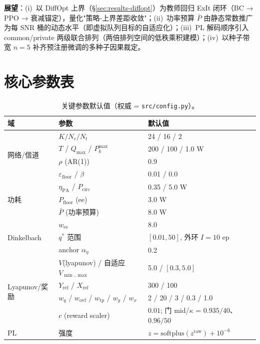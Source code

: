 \documentclass[UTF8,11pt,a4paper]{ctexart}
\theoremstyle{plain}
\theoremstyle{definition}
\theoremstyle{remark}
\begin{document}
\textbf{展望}：(i)~以 DiffOpt 上界（\S\ref{sec:results-diffopt}）为教师回归 ExIt 闭环（BC → PPO → 衰减锚定），量化"策略-上界差距收敛"；(ii)~功率预算 $\bar P$ 由静态常数推广为每 SNR 桶的动态水平（即虚拟队列目标的自适应化）；(iii)~PL 解码顺序引入 common/private 两级联合排列（两倍排列空间的低秩乘积建模）；(iv)~以种子带宽 $n=5$ 补齐预注册微调的多种子因果裁定。

\appendix
\section{核心参数表} \label{sec:params}

\begin{table}[ht]
\centering
\caption{关键参数默认值（权威 = \texttt{src/config.py}）。}
\label{tab:params}
\begin{tabular}{@{}lll@{}}
\toprule
域 & 参数 & 默认值\\
\midrule
\multirow{4}{*}{网络/信道} & $K/N_r/N_t$ & 24 / 16 / 2\\
 & $T$ / $Q_{\max}$ / $P_{k}^{\max}$ & 200 / 100 / 1.0 W\\
 & $\rho$ (AR(1)) & 0.9\\
 & $\varepsilon_{\mathrm{floor}}$ / $\beta$ & 0.01 / 0.0\\
\midrule
\multirow{3}{*}{功耗} & $\eta_{\mathrm{PA}}$ / $P_{\mathrm{circ}}$ & 0.35 / 5.0 W\\
 & $P_{\mathrm{floor}}$ (ee) & 3.0 W\\
 & $\bar P$ (功率预算) & 8.0 W\\
\midrule
\multirow{3}{*}{Dinkelbach} & $w_{\mathrm{ee}}$ & 8.0\\
 & $q^*$ 范围 & $[0.01,50]$, 外环 $I{=}10$ ep\\
 & anchor $\alpha_\eta$ & 0.2\\
\midrule
\multirow{4}{*}{Lyapunov/奖励} & $V$(lyapunov) / 自适应 $V_{\min..\max}$ & 5.0 / $[0.3,5.0]$\\
 & $Y_{\mathrm{ref}}$ / $X_{\mathrm{ref}}$ & 300 / 100\\
 & $w_q$ / $w_{\mathrm{ovf}}$ / $w_{\mathrm{tp}}$ / $w_y$ / $w_x$ & 2 / 20 / 3 / 0.3 / 1.0\\
 & $c$ (reward scaler) & $0.01$; 门 mid/$\kappa$ = $0.935/40$、$0.96/50$\\
\midrule
\multirow{4}{*}{PL} & 强度 & $z=\mathrm{softplus}(z^{\mathrm{raw}})+10^{-6}$\\

\end{tabular}
\end{table}
\end{document}
